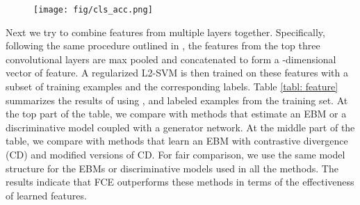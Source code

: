 \documentclass[10pt,twocolumn,letterpaper]{article}
\begin{document}
\begin{figure}
\begin{center}
	\texttt{[image: fig/cls\_acc.png]}
    \label{fig: cls_acc}
\end{center}
\end{figure} 

Next we try to combine features from multiple layers together. Specifically, following the same procedure outlined in \cite{radford2015unsupervised}, the features from the top three convolutional layers are max pooled and concatenated to form a -dimensional vector of feature. A regularized L2-SVM is then trained on these features with a subset of training examples and the corresponding labels. Table \ref{tabl: feature} summarizes the results of using ,  and  labeled examples from the training set. At the top part of the table, we compare with methods that estimate an EBM or a discriminative model coupled with a generator network. At the middle part of the table, we compare with methods that learn an EBM with contrastive divergence (CD) and modified versions of CD. For fair comparison, we use the same model structure for the EBMs or discriminative models used in all the methods. The results indicate that FCE outperforms these methods in terms of the effectiveness of learned features.  
\end{document}

